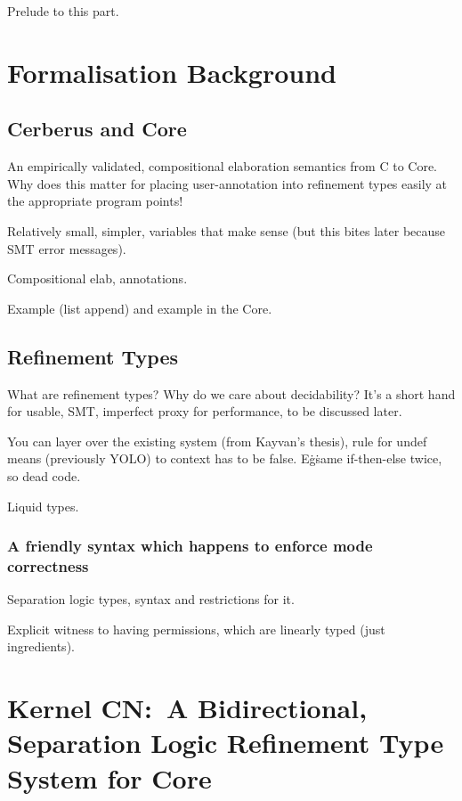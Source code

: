 Prelude to this part.

\chapter{Formalisation Background}%
\label{chap:formal-background}

\section{Cerberus and Core}%
\label{sec:cerberus-core}

An empirically validated, compositional elaboration semantics from C to Core.
Why does this matter \textemdash{} for placing user-annotation into refinement types
easily at the appropriate program points!

Relatively small, simpler, variables that make sense (but this bites later because SMT error messages).

Compositional elab, annotations.

Example (list append) and example in the Core.

\section{Refinement Types}

What are refinement types? Why do we care about decidability? It's a short hand
for usable, SMT, imperfect proxy for performance, to be discussed later.

You can layer over the existing system (from Kayvan's thesis), \textendash{}
rule for undef means (previously YOLO) to context has to be false. E\.g\. same if-then-else twice, so dead code.

Liquid types.

\subsection{A friendly syntax which happens to enforce mode correctness}\label{sec:mode-syntax}
Separation logic types, syntax and restrictions for it.

Explicit witness to having permissions, which are linearly typed (just ingredients).

\chapter{Kernel CN:\ A Bidirectional, Separation Logic Refinement Type System for Core}%
\label{chap:kernel-cn}

